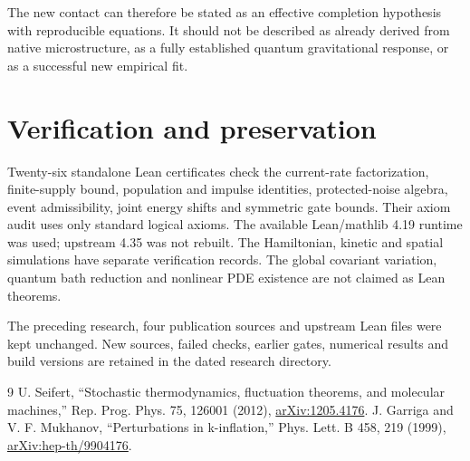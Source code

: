 \documentclass[11pt]{article}
\begin{document}
The new contact can therefore be stated as an effective completion
hypothesis with reproducible equations. It should not be described as
already derived from native microstructure, as a fully established
quantum gravitational response, or as a successful new empirical fit.

\section{Verification and preservation}
Twenty-six standalone Lean certificates check the current-rate
factorization, finite-supply bound, population and impulse identities,
protected-noise algebra, event admissibility, joint energy shifts and
symmetric gate bounds. Their axiom audit uses only standard logical axioms.
The available Lean/mathlib 4.19 runtime was used; upstream 4.35 was not rebuilt.
The Hamiltonian, kinetic and spatial simulations have separate verification
records. The global covariant variation, quantum bath reduction and
nonlinear PDE existence are not claimed as Lean theorems.

The preceding research, four publication sources and upstream Lean files
were kept unchanged. New sources, failed checks, earlier gates, numerical
results and build versions are retained in the dated research directory.

\begin{thebibliography}{9}
 U. Seifert, ``Stochastic thermodynamics, fluctuation theorems,
and molecular machines,'' Rep. Prog. Phys. 75, 126001 (2012),
\href{https://arxiv.org/abs/1205.4176}{arXiv:1205.4176}.
 J. Garriga and V. F. Mukhanov, ``Perturbations in k-inflation,''
Phys. Lett. B 458, 219 (1999),
\href{https://arxiv.org/abs/hep-th/9904176}{arXiv:hep-th/9904176}.
\end{thebibliography}
\end{document}
